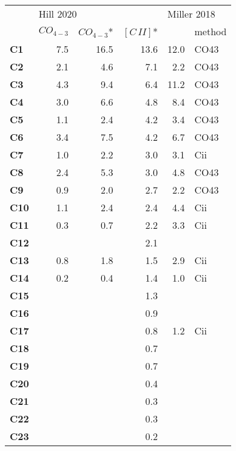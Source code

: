 \begin{tabular}{l|rrr|rl}
\toprule
{} & \multicolumn{3}{l}{Hill 2020} & \multicolumn{2}{|l}{Miller 2018} \\
{} &      $CO_{4-3}$ & $CO_{4-3}$* &   $[C\,{II}]$* &      & method \\
\midrule
\textbf{C1   } &       7.5 &         16.5 &      13.6 &        12.0 &   CO43 \\
\textbf{C2   } &       2.1 &          4.6 &       7.1 &         2.2 &   CO43 \\
\textbf{C3   } &       4.3 &          9.4 &       6.4 &        11.2 &   CO43 \\
\textbf{C4   } &       3.0 &          6.6 &       4.8 &         8.4 &   CO43 \\
\textbf{C5   } &       1.1 &          2.4 &       4.2 &         3.4 &   CO43 \\
\textbf{C6   } &       3.4 &          7.5 &       4.2 &         6.7 &   CO43 \\
\textbf{C7   } &       1.0 &          2.2 &       3.0 &         3.1 &    Cii \\
\textbf{C8   } &       2.4 &          5.3 &       3.0 &         4.8 &   CO43 \\
\textbf{C9   } &       0.9 &          2.0 &       2.7 &         2.2 &   CO43 \\
\textbf{C10  } &       1.1 &          2.4 &       2.4 &         4.4 &    Cii \\
\textbf{C11  } &       0.3 &          0.7 &       2.2 &         3.3 &    Cii \\
\textbf{C12  } &           &              &       2.1 &             &        \\
\textbf{C13  } &       0.8 &          1.8 &       1.5 &         2.9 &    Cii \\
\textbf{C14  } &       0.2 &          0.4 &       1.4 &         1.0 &    Cii \\
\textbf{C15  } &           &              &       1.3 &             &        \\
\textbf{C16  } &           &              &       0.9 &             &        \\
\textbf{C17  } &           &              &       0.8 &         1.2 &    Cii \\
\textbf{C18  } &           &              &       0.7 &             &        \\
\textbf{C19  } &           &              &       0.7 &             &        \\
\textbf{C20  } &           &              &       0.4 &             &        \\
\textbf{C21  } &           &              &       0.3 &             &        \\
\textbf{C22  } &           &              &       0.3 &             &        \\
\textbf{C23  } &           &              &       0.2 &             &        \\
\bottomrule
\end{tabular}
